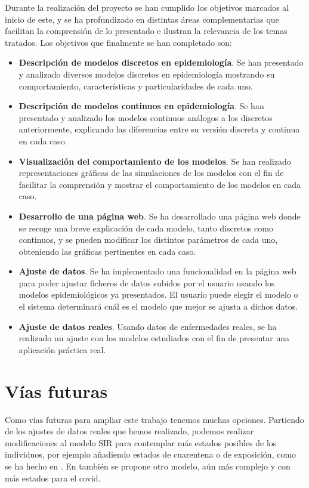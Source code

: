Durante la realización del proyecto se han cumplido los objetivos marcados al inicio de este, y se ha profundizado en distintas áreas complementarias que facilitan la comprensión de lo presentado e ilustran la relevancia de los temas tratados. Los objetivos que finalmente se han completado son:

\begin{itemize}
\item \textbf{Descripción de modelos discretos en epidemiología}. Se han presentado y analizado diversos modelos discretos en epidemiología mostrando su comportamiento, características y particularidades de cada uno.
\item \textbf{Descripción de modelos continuos en epidemiología}. Se han presentado y analizado los modelos continuos análogos a los discretos anteriormente, explicando las diferencias entre su versión discreta y continua en cada caso.
\item \textbf{Visualización del comportamiento de los modelos}. Se han realizado representaciones gráficas de las simulaciones de los modelos con el fin de facilitar la comprensión y mostrar el comportamiento de los modelos en cada caso.
\item \textbf{Desarrollo de una página web}. Se ha desarrollado una página web donde se recoge una breve explicación de cada modelo, tanto discretos como continuos, y se pueden modificar los distintos parámetros de cada uno, obteniendo las gráficas pertinentes en cada caso.
\item \textbf{Ajuste de datos}. Se ha implementado una funcionalidad en la página web para poder ajustar ficheros de datos subidos por el usuario usando los modelos epidemiológicos ya presentados. El usuario puede elegir el modelo o el sistema determinará cuál es el modelo que mejor se ajusta a dichos datos.
\item \textbf{Ajuste de datos reales}. Usando datos de enfermedades reales, se ha realizado un ajuste con los modelos estudiados con el fin de presentar una aplicación práctica real.
\end{itemize}

\section{Vías futuras}

Como vías futuras para ampliar este trabajo tenemos muchas opciones. Partiendo de los ajustes de datos reales que hemos realizado, podemos realizar modificaciones al modelo SIR para contemplar más estados posibles de los individuos, por ejemplo añadiendo estados de cuarentena o de exposición, como se ha hecho en \cite{gutierrez2020analisis}. En \cite{RAMOS2021105937} también se propone otro modelo, aún más complejo y con más estados para el covid.

